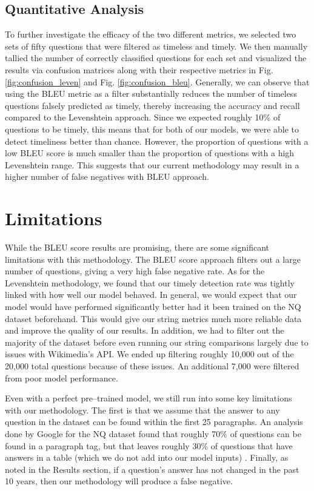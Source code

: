 \documentclass{article}
\begin{document}
\subsection{Quantitative Analysis}

To further investigate the efficacy of the two different metrics, we selected
two sets of fifty questions that were filtered as timeless and timely. We then
manually tallied the number of correctly classified questions for each set and
visualized the results via confusion matrices along with their respective
metrics in Fig. \ref{fig:confusion_leven} and Fig. \ref{fig:confusion_bleu}.
Generally, we can observe that using the BLEU metric as a filter substantially
reduces the number of timeless questions falsely predicted as timely, thereby
increasing the accuracy and recall compared to the Levenshtein approach. Since
we expected roughly 10\% of questions to be timely, this means that for both of
our models, we were able to detect timeliness better than chance. However, the
proportion of questions with a low BLEU score is much smaller than the
proportion of questions with a high Levenshtein range. This suggests that our
current methodology may result in a higher number of false negatives with BLEU
approach.


\section{Limitations}
While the BLEU score results are promising, there are some significant
limitations with this methodology. The BLEU score approach filters out a large
number of questions, giving a very high false negative rate. As for the
Levenshtein methodology, we found that our timely detection rate was tightly
linked with how well our model behaved. In general, we would expect that our
model would have performed significantly better had it been trained on the NQ
dataset beforehand. This would give our string metrics much more reliable data
and improve the quality of our results. In addition, we had to filter out the
majority of the dataset before even running our string comparisons largely due
to issues with Wikimedia's API. We ended up filtering roughly 10,000 out of the
20,000 total questions because of these issues. An additional 7,000 were
filtered from poor model performance.


Even with a perfect pre--trained model, we still run into some key limitations
with our methodology. The first is that we assume that the answer to any
question in the dataset can be found within the first 25 paragraphs. An analysis
done by Google for the NQ dataset found that roughly 70\% of questions can be
found in a paragraph tag, but that leaves roughly 30\% of questions that have
answers in a table (which we do not add into our model inputs) \cite{nqdataset}.
Finally, as noted in the Results section, if a question’s answer has not changed
in the past 10 years, then our methodology will produce a false negative.
\end{document}
